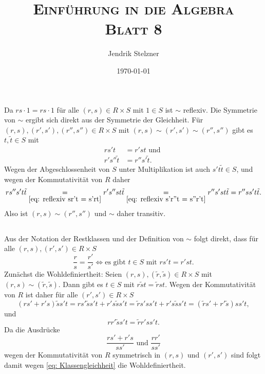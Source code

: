 \documentclass[a4paper,10pt]{article}
\title{\textsc{Einführung in die Algebra \\ \Large Blatt 8}}
\author{Jendrik Stelzner}
\date{\today}
\theoremstyle{definition}
\begin{document}
\maketitle




\section{}


\subsection{}
Da $rs \cdot 1 = rs \cdot 1$ für alle $(r,s) \in R \times S$ mit $1 \in S$ ist $\sim$ reflexiv. Die Symmetrie von $\sim$ ergibt sich direkt aus der Symmetrie der Gleichheit. Für $(r,s), (r',s'), (r'',s'') \in R \times S$ mit $(r,s) \sim (r',s') \sim (r'', s'')$ gibt es $t, \tilde{t} \in S$ mit
\begin{align}
 rs't &= r'st \text{ und }         \label{eq: reflexiv sr't = s'rt} \\
 r's''\tilde{t} &= r''s'\tilde{t}. \label{eq: reflexiv s'r''t = s''r't}
\end{align}
Wegen der Abgeschlossenheit von $S$ unter Multiplikation ist auch $s't\tilde{t} \in S$, und wegen der Kommutativität von $R$ daher
\[
 r s'' s' t \tilde{t}
 \underset{\eqref{eq: reflexiv sr't = s'rt}}= r' s'' s t \tilde{t}
 \underset{\eqref{eq: reflexiv s'r''t = s''r't}}= r'' s' s t \tilde{t}
 = r'' s s' t \tilde{t}.
\]
Also ist $(r,s) \sim (r'', s'')$ und $\sim$ daher transitiv.


\subsection{}
Aus der Notation der Restklassen und der Definition von $\sim$ folgt direkt, dass für alle $(r,s), (r', s') \in R \times S$
\begin{equation} \label{eq: Klassengleichheit}
 \frac{r}{s} = \frac{r'}{s'} \Leftrightarrow \text{es gibt $t \in S$ mit } rs' t = r's t.
\end{equation}
Zunächst die Wohldefiniertheit: Seien $(r,s), (\tilde{r},\tilde{s}) \in R \times S$ mit $(r,s) \sim (\tilde{r},\tilde{s})$. Dann gibt es $t \in S$ mit $r \tilde{s} t = \tilde{r} s t$. Wegen der Kommutativität von $R$ ist daher für alle $(r', s') \in R \times S$
\[
 (rs'+r's) \tilde{s} s' t
 = r s' \tilde{s} s' t + r' s \tilde{s} s' t
 = \tilde{r} s' s s' t + r' s \tilde{s} s' t
 = (\tilde{r} s' + r' \tilde{s}) s s ' t,
\]
und
\[
 r r' \tilde{s} s' t = \tilde{r} r' s s' t.
\]
Da die Ausdrücke
\[
 \frac{rs'+r's}{ss'} \text{ und } \frac{r r'}{s s'}
\]
wegen der Kommutativität von $R$ symmetrisch in $(r,s)$ und $(r', s')$ sind folgt damit wegen \eqref{eq: Klassengleichheit} die Wohldefiniertheit. 
\end{document}
